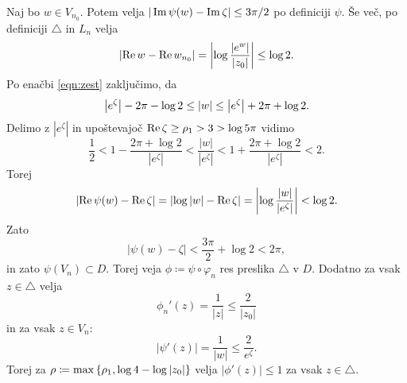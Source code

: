 \begin{dokaz}
    Naj bo \(w \in V_{n_0}\). Potem velja \(|\operatorname{Im} \psi (w) - \operatorname{Im} \zeta| \leq 3 \pi / 2\) po definiciji \(\psi\). Še več, po definiciji \(\triangle\) in \(L_n\) velja
    \[\left\lvert\operatorname{Re} w - \operatorname{Re} w_{n_0}\right\rvert = \left\lvert\log \frac{|e^w|}{|z_0|}\right\rvert \leq \log 2.\]
    Po enačbi \eqref{eqn:zest} zaključimo, da
    \[\left\lvert e^{\zeta}\right\rvert - 2 \pi - \log 2 \leq |w| \leq \left\lvert e^{\zeta}\right\rvert + 2 \pi + \log 2.\]
    Delimo z \(|e^{\zeta}|\) in upoštevajoč \(\operatorname{Re} \zeta \geq \rho_1 > 3 > \log 5 \pi\) vidimo
    \[\frac{1}{2} < 1 - \frac{2 \pi + \log 2}{|e^{\zeta}|} < \frac{|w|}{|e^{\zeta}|} < 1 + \frac{2 \pi + \log 2}{|e^{\zeta}|} < 2.\]
    Torej
    \[\left\lvert\operatorname{Re} \psi (w) - \operatorname{Re} \zeta\right\rvert = \left\lvert\log |w| - \operatorname{Re} \zeta\right\rvert = \left\lvert\log \frac{|w|}{|e^{\zeta}|}\right\rvert < \log 2.\]
    Zato
    \[|\psi (w) - \zeta| < \frac{3 \pi}{2} + \log 2 < 2 \pi,\]
    in zato \(\psi (V_n) \subset D\). Torej veja \(\phi \coloneq \psi \circ \varphi_n\) res preslika \(\triangle\) v \(D\). Dodatno za vsak \(z \in \triangle\) velja
    \[\phi_{n}' (z) = \frac{1}{|z|} \leq \frac{2}{|z_0|}\]
    in za vsak \(z \in V_n\):
    \[|\psi' (z)| = \frac{1}{|w|} \leq \frac{2}{e^{\zeta}}.\]
    Torej za \(\rho \coloneq \max \left\{ \rho_1, \log 4 - \log |z_0| \right\}\) velja \(|\phi' (z)| \leq 1\) za vsak \(z \in \triangle\).
\end{dokaz}

